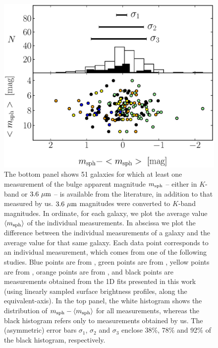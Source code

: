 \documentclass[preprint2]{emulateapj}
\begin{document}
\begin{figure}%
\begin{center}
\includegraphics[width=1.1\columnwidth]{images/comparison_all_mag_sph.eps} 
\caption{The bottom panel shows 51 galaxies for which at least one measurement 
of the bulge apparent magnitude $m_{\rm sph}$ -- either in $K$-band or $3.6~\rm \mu m$ -- is available 
from the literature, in addition to that measured by us. 
$3.6~\rm \mu m$ magnitudes were converted to $K$-band magnitudes.
In ordinate, for each galaxy, we plot the average value $\langle m_{\rm sph} \rangle$ 
of the individual measurements. 
In abscissa we plot the difference between the individual measurements of a galaxy 
and the average value for that same galaxy.
Each data point corresponds to an individual measurement, 
which comes from one of the following studies. 
Blue points are from \cite{laurikainen2010}, green points are from \cite{sani2011}, 
yellow points are from \cite{vika2012}, 
orange points are from \cite{lasker2014data},
and black points are measurements obtained from the 1D fits presented in this work 
(using linearly sampled surface brightness profiles, along the equivalent-axis).
In the top panel, the white histogram shows the distribution of $m_{\rm sph} - \langle m_{\rm sph} \rangle$ 
for all measurements, 
whereas the black histogram refers only to measurements obtained by us.
The (asymmetric) error bars $\sigma_1$, $\sigma_2$ and $\sigma_3$ enclose 38\%, 78\% and 92\% 
of the black histogram, respectively.}
\label{fig:compmag}
\end{center}
\end{figure}
\end{document}
